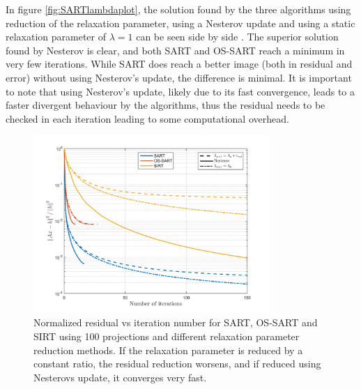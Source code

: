 In figure \ref{fig:SARTlambdaplot}, the solution found by the three algorithms using reduction of the relaxation parameter, using a Nesterov update and using a static relaxation parameter of $\lambda=1$ can be seen side by side . The superior solution found by Nesterov is clear, and both SART and OS-SART reach a minimum in very few iterations. While SART does reach a better image (both in residual and error) without using Nesterov's update, the difference is minimal. It is important to note that using Nesterov's update, likely due to its fast convergence, leads to a faster divergent behaviour by the algorithms, thus the residual needs to be checked in each iteration leading to some computational overhead.

\begin{figure}[H]
\begin{center}

\includegraphics[width=0.8\textwidth]{Applications/SARTlambda.png} 
\end{center}

\caption[Nomralized residual vs iteration of SART/OS-SART/SIRT with different relaxation parameters]{\label{fig:SARTlambda} Normalized residual vs iteration number for SART, OS-SART and SIRT using 100 projections and different relaxation parameter reduction methods. If the relaxation parameter is reduced by a constant ratio, the residual reduction worsens, and if reduced using Nesterovs update, it converges very fast.} 
\end{figure}


